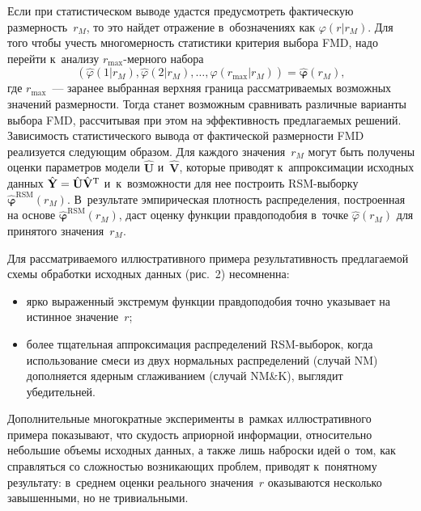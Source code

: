 \begin{multicols}{2}
     Если при статистическом выводе удастся предусмотреть фактическую 
размерность~$r_M$, то это \mbox{найдет} отражение в~обозначениях как $\varphi(r\vert 
r_M)$. Для того чтобы учесть многомерность статистики критерия выбора 
FMD, надо перейти к~анализу $r_{\max}$-мер\-но\-го набора 
     $$
     \left(\hat{\varphi}(1\vert r_M), \hat{\varphi}(2\vert r_M),\ldots , 
\hat{\varphi}(r_{\max}\vert r_M)\right)= \hat{\bm{\varphi}}(r_M),
$$
 где  
$r_{\max}$~--- заранее выбранная верхняя граница рассматриваемых 
возможных значений размерности. Тогда станет возможным сравнивать 
различные варианты выбора FMD, рассчитывая при этом на эффективность 
предлагаемых решений. Зависимость статистического вывода от фактической 
размерности FMD реализуется следующим образом. Для каждого 
значения~$r_M$ могут быть получены оценки параметров модели 
$\hat{\mathbf{U}}$ и~$\hat{\mathbf{V}}$, которые приводят к~аппроксимации 
исходных данных $\hat{\mathbf{Y}}\hm= \hat{\mathbf{U}} 
\hat{\mathbf{V}}^{\mathrm{T}}$ и~к~возможности для нее построить  
RSM-вы\-бор\-ку $\hat{\bm{\varphi}}^{\mathrm{RSM}}(r_M)$. В~результате 
эмпирическая плотность распределения, построенная на основе 
$\hat{\bm{\varphi}}^{\mathrm{RSM}}(r_M)$, даст оценку функции 
правдоподобия в~точке $\hat{\varphi}(r_M)$ для принятого значения~$r_M$.
     
     Для рассматриваемого иллюстративного примера результативность 
предлагаемой схемы обработки исходных данных (рис.~2) несомненна: 
     \begin{itemize}
\item ярко выраженный экстремум функции правдоподобия точно указывает на 
истинное значение~$r$;
\item более тщательная аппроксимация распределений RSM-вы\-бо\-рок, когда 
использование смеси из двух нормальных распределений (случай NM) 
дополняется ядерным сглаживанием (случай NM\&K), выглядит убедительней.
     \end{itemize}
     

     
   
     
     Дополнительные многократные эксперименты в~рамках иллюстративного 
примера показывают, что скудость априорной информации, относительно 
небольшие объемы исходных данных, а также лишь наброски идей о~том, как 
справляться со слож\-ностью возникающих проб\-лем, приводят к~понятному 
результату: в~среднем оценки реального значения~$r$ оказываются несколько 
завышенными, но не тривиальными. 




\end{multicols}
